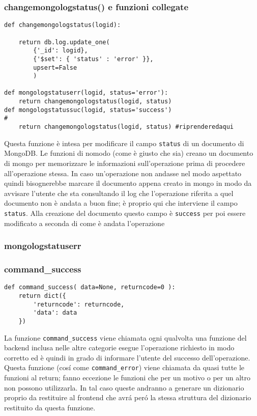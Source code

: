 \documentclass[11pt]{article}
\begin{document}
\subsubsection{changemongologstatus() e funzioni collegate }\label{logstatus}
\begin{lstlisting}
def changemongologstatus(logid):

    return db.log.update_one(
        {'_id': logid},
        {'$set': { 'status' : 'error' }},
        upsert=False
        )

def mongologstatuserr(logid, status='error'):
    return changemongologstatus(logid, status)
def mongologstatussuc(logid, status='success')                                                              #
    return changemongologstatus(logid, status) #riprenderedaqui
\end{lstlisting}
Questa funzione è intesa per modificare il campo \texttt{status} di un documento di MongoDB. Le funzioni di nomodo (come è giusto che sia)
creano un documento di mongo per memorizzare le informazioni sull'operazione prima di procedere all'operazione stessa.
In caso un'operazione non andasse nel modo aspettato quindi bisognerebbe marcare il documento appena creato in mongo in modo da avvisare l'utente
che sta consultando il log che l'operazione riferita a quel documento non è andata a buon fine; è proprio qui che interviene il campo \texttt{status}.
Alla creazione del documento questo campo è \texttt{success} per poi essere modificato a seconda di come è andata l'operazione


\subsubsection{mongologstatuserr}\label{mongologstatuserr}

\subsubsection{command\_success}\label{command\string_success}
\begin{lstlisting}
def command_success( data=None, returncode=0 ):
    return dict({
        'returncode': returncode,
        'data': data
    })
\end{lstlisting}
La funzione \texttt{command\_success} viene chiamata ogni qualvolta una funzione del backend inclusa nelle altre categorie esegue l'operazione
richiesto in modo corretto ed è quindi in grado di informare l'utente del successo dell'operazione.
Questa funzione (cos\'i come \texttt{command\_error}) viene chiamata da quasi tutte le funzioni al return; fanno eccezione le funzioni che
per un motivo o per un altro non possono utilizzarla. In tal caso queste andranno a generare un dizionario proprio da restituire al frontend
che avr\'a per\'o la stessa struttura del dizionario restituito da questa funzione.
\\~\\
\end{document}
